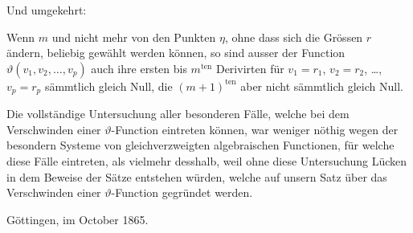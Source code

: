 \documentclass{article}
\begin{document}
Und umgekehrt:

Wenn $m$ und nicht mehr von den Punkten $\eta$, ohne dass sich die Grössen $r$ ändern, beliebig gewählt werden können, so sind ausser der Function $\vartheta(v_1, v_2, \dots, v_p)$ auch ihre ersten bis $m^{\text{ten}}$ Derivirten für $v_1 = r_1$, $v_2 = r_2$, \dots, $v_p = r_p$ sämmtlich gleich Null, die $(m+1)^{\text{ten}}$ aber nicht sämmtlich gleich Null.

Die vollständige Untersuchung aller besonderen Fälle, welche bei dem Verschwinden einer $\vartheta$-Function eintreten können, war weniger nöthig wegen der besondern Systeme von gleichverzweigten algebraischen Functionen, für welche diese Fälle eintreten, als vielmehr desshalb, weil ohne diese Untersuchung Lücken in dem Beweise der Sätze entstehen würden, welche auf unsern Satz über das Verschwinden einer $\vartheta$-Function gegründet werden.

Göttingen, im October 1865.
\end{document}
